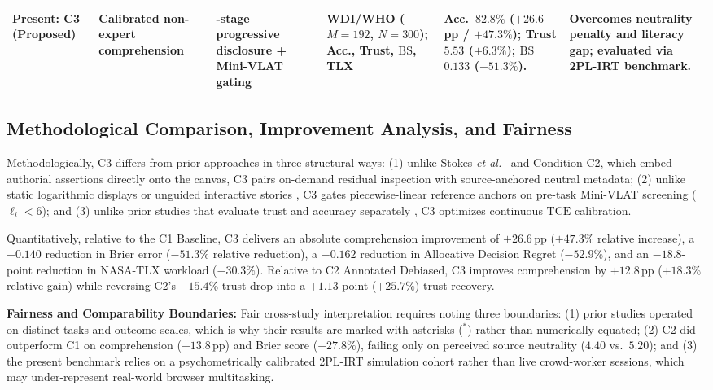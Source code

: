 \documentclass[conference]{IEEEtran}
\newcommand{\TCE}{\mathrm{TCE}}
\newcommand{\BS}{\mathrm{BS}}
\newcommand{\WdiM}{192}
\begin{document}
\begin{table}[!t]
\begin{tabularx}{\textwidth}{@{}>{\raggedright\arraybackslash}p{2.5cm}>{\raggedright\arraybackslash}p{2.3cm}>{\raggedright\arraybackslash}p{2.5cm}>{\raggedright\arraybackslash}p{2.5cm}>{\raggedright\arraybackslash}p{3.0cm}Y@{}}
\textbf{Present: C3 (Proposed)} & Calibrated non-expert comprehension & 3-stage progressive disclosure + Mini-VLAT gating & WDI/WHO ($M=\WdiM$, $N=300$); Acc., Trust, $\BS$, TLX & Acc.\ $82.8\%$ ($+26.6$\,pp / $+47.3\%$); Trust $5.53$ ($+6.3\%$); $\BS$ $0.133$ ($-51.3\%$). & Overcomes neutrality penalty and literacy gap; evaluated via 2PL-IRT benchmark. \\
\bottomrule
\end{tabularx}
\end{table}

\subsection{Methodological Comparison, Improvement Analysis, and Fairness}
Methodologically, C3 differs from prior approaches in three structural ways: (1) unlike Stokes \textit{et al.}\ \cite{stokes2024} and Condition C2, which embed authorial assertions directly onto the canvas, C3 pairs on-demand residual inspection with source-anchored neutral metadata; (2) unlike static logarithmic displays \cite{batziakoudi2026} or unguided interactive stories \cite{kim2024}, C3 gates piecewise-linear reference anchors on pre-task Mini-VLAT screening ($\ell_i < 6$); and (3) unlike prior studies that evaluate trust and accuracy separately \cite{song2026,kaufman2026}, C3 optimizes continuous $\TCE$ calibration.

Quantitatively, relative to the C1 Baseline, C3 delivers an absolute comprehension improvement of $+26.6$\,pp ($+47.3\%$ relative increase), a $-0.140$ reduction in Brier error ($-51.3\%$ relative reduction), a $-0.162$ reduction in Allocative Decision Regret ($-52.9\%$), and an $-18.8$-point reduction in NASA-TLX workload ($-30.3\%$). Relative to C2 Annotated Debiased, C3 improves comprehension by $+12.8$\,pp ($+18.3\%$ relative gain) while reversing C2's $-15.4\%$ trust drop into a $+1.13$-point ($+25.7\%$) trust recovery.

\textbf{Fairness and Comparability Boundaries:} Fair cross-study interpretation requires noting three boundaries: (1) prior studies \cite{stokes2024,kaufman2026,batziakoudi2026,kim2024} operated on distinct tasks and outcome scales, which is why their results are marked with asterisks ($^{*}$) rather than numerically equated; (2) C2 did outperform C1 on comprehension ($+13.8$\,pp) and Brier score ($-27.8\%$), failing only on perceived source neutrality ($4.40$ vs.\ $5.20$); and (3) the present benchmark relies on a psychometrically calibrated 2PL-IRT simulation cohort rather than live crowd-worker sessions, which may under-represent real-world browser multitasking.
\end{document}
